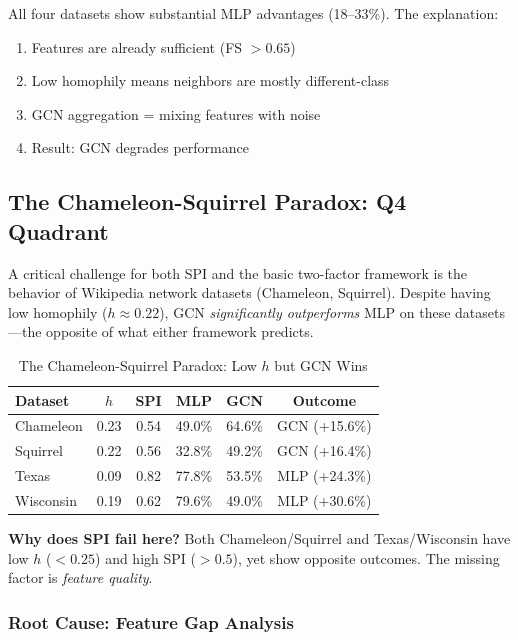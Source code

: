 All four datasets show substantial MLP advantages (18--33\%). The explanation:
\begin{enumerate}
    \item Features are already sufficient (FS $> 0.65$)
    \item Low homophily means neighbors are mostly different-class
    \item GCN aggregation = mixing features with noise
    \item Result: GCN degrades performance
\end{enumerate}

\subsection{The Chameleon-Squirrel Paradox: Q4 Quadrant}
\label{sec:chameleon_paradox}

A critical challenge for both SPI and the basic two-factor framework is the behavior of Wikipedia network datasets (Chameleon, Squirrel). Despite having low homophily ($h \approx 0.22$), GCN \textit{significantly outperforms} MLP on these datasets---the opposite of what either framework predicts.

\begin{table}[t]
\centering
\caption{The Chameleon-Squirrel Paradox: Low $h$ but GCN Wins}
\label{tab:paradox}
\small
\begin{tabular}{@{}lccccc@{}}
\toprule
\textbf{Dataset} & \textbf{$h$} & \textbf{SPI} & \textbf{MLP} & \textbf{GCN} & \textbf{Outcome} \\
\midrule
Chameleon & 0.23 & 0.54 & 49.0\% & 64.6\% & GCN (+15.6\%) \\
Squirrel & 0.22 & 0.56 & 32.8\% & 49.2\% & GCN (+16.4\%) \\
\midrule
Texas & 0.09 & 0.82 & 77.8\% & 53.5\% & MLP (+24.3\%) \\
Wisconsin & 0.19 & 0.62 & 79.6\% & 49.0\% & MLP (+30.6\%) \\
\bottomrule
\end{tabular}
\end{table}

\textbf{Why does SPI fail here?} Both Chameleon/Squirrel and Texas/Wisconsin have low $h$ ($< 0.25$) and high SPI ($> 0.5$), yet show opposite outcomes. The missing factor is \textit{feature quality}.

\subsubsection{Root Cause: Feature Gap Analysis}

